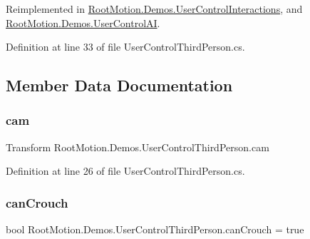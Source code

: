 Reimplemented in \mbox{\hyperlink{class_root_motion_1_1_demos_1_1_user_control_interactions_a2d76c83d8d9a1decde791592e03561ee}{Root\+Motion.\+Demos.\+User\+Control\+Interactions}}, and \mbox{\hyperlink{class_root_motion_1_1_demos_1_1_user_control_a_i_ab0d7ff405d38dd90d40941fd3d071762}{Root\+Motion.\+Demos.\+User\+Control\+AI}}.



Definition at line 33 of file User\+Control\+Third\+Person.\+cs.



\subsection{Member Data Documentation}
\mbox{\label{class_root_motion_1_1_demos_1_1_user_control_third_person_ab42ab476cc3caa5240e9c0b51b5ea09f}} 
\subsubsection{\texorpdfstring{cam}{cam}}
{\footnotesize\ttfamily Transform Root\+Motion.\+Demos.\+User\+Control\+Third\+Person.\+cam\hspace{0.3cm}{\ttfamily [protected]}}



Definition at line 26 of file User\+Control\+Third\+Person.\+cs.

\mbox{\label{class_root_motion_1_1_demos_1_1_user_control_third_person_a191b6a7cea8cb86eaab2b583221393df}} 
\subsubsection{\texorpdfstring{can\+Crouch}{canCrouch}}
{\footnotesize\ttfamily bool Root\+Motion.\+Demos.\+User\+Control\+Third\+Person.\+can\+Crouch = true}



